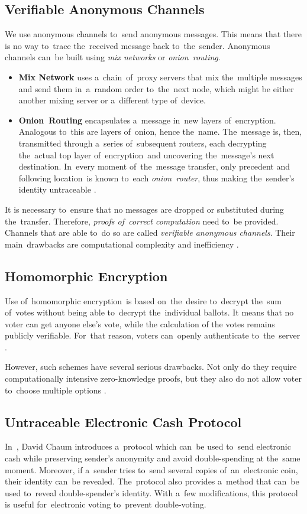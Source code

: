 \subsection{Verifiable Anonymous Channels}
We use anonymous channels to~send anonymous messages. This means that there is no way to~trace the~received message back to~the~sender. Anonymous channels can~be built using \emph{mix networks} or \emph{onion~routing}. 
\begin{itemize}
\item \textbf{Mix Network} uses a~chain~of~proxy servers that mix the~multiple messages and send them in~a~random order to~the~next node, which might be either another mixing server or a~different type of~device.
\item \textbf{Onion~Routing} encapsulates a~message in~new layers of~encryption. Analogous to~this are layers of~onion, hence the~name. The~message is, then, transmitted through a~series of~subsequent routers, each decrypting the~actual top layer of~encryption~and uncovering the~message's next destination. In~every moment of~the~message transfer, only precedent and following location~is known to~each \emph{onion~router}, thus making the~sender's identity untraceable \cite{Goldschlag}.
\end{itemize}

It is necessary to~ensure that no messages are dropped or substituted during the~transfer. Therefore, \emph{proofs of~correct computation} need to~be provided. Channels that are able to~do so are called \emph{verifiable anonymous channels}. Their main~drawbacks are computational complexity and inefficiency \cite{Haenni}.


\subsection{Homomorphic Encryption} 
Use of~homomorphic encryption~is based on~the~desire to~decrypt the~sum of~votes without being able to~decrypt the~individual ballots. It means that no voter can get anyone else's vote, while the calculation of the votes remains publicly verifiable. For~that reason, voters can~openly authenticate to~the~server \cite{Katz}.

However, such schemes have several serious drawbacks. Not only do they require computationally intensive zero-knowledge proofs, but they also do not allow voter to~choose multiple options \cite{Haenni}.
\subsection{Untraceable Electronic Cash Protocol}
In~\cite{Chaum}, David Chaum introduces a~protocol which can~be used to~send electronic cash while preserving sender's anonymity and avoid double-spending at the~same moment. Moreover, if a~sender tries to~send several copies of~an~electronic coin, their identity can~be revealed. The~protocol also provides a~method that can~be used to~reveal double-spender's identity. With a~few modifications, this protocol is useful for~electronic voting to~prevent double-voting. %

